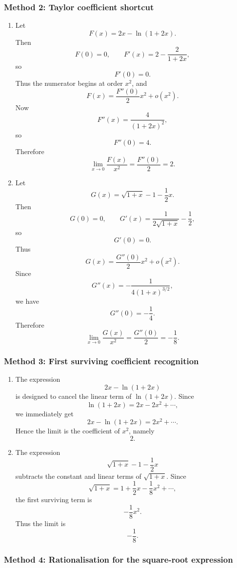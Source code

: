 \documentclass[12pt]{article}
\begin{document}
\subsubsection{Method 2: Taylor coefficient shortcut}

\begin{enumerate}[label=(\alph*)]

\item
Let
\[
F(x)=2x-\ln(1+2x).
\]
Then
\[
F(0)=0,\qquad F'(x)=2-\frac{2}{1+2x},
\]
so
\[
F'(0)=0.
\]
Thus the numerator begins at order \(x^2\), and
\[
F(x)=\frac{F''(0)}{2}x^2+o(x^2).
\]
Now
\[
F''(x)=\frac{4}{(1+2x)^2},
\]
so
\[
F''(0)=4.
\]
Therefore
\[
\boxed{
\lim_{x\to0}\frac{F(x)}{x^2}
=
\frac{F''(0)}{2}
=
2.
}
\]

\item
Let
\[
G(x)=\sqrt{1+x}-1-\frac12x.
\]
Then
\[
G(0)=0,\qquad
G'(x)=\frac{1}{2\sqrt{1+x}}-\frac12,
\]
so
\[
G'(0)=0.
\]
Thus
\[
G(x)=\frac{G''(0)}{2}x^2+o(x^2).
\]
Since
\[
G''(x)=-\frac{1}{4(1+x)^{3/2}},
\]
we have
\[
G''(0)=-\frac14.
\]
Therefore
\[
\boxed{
\lim_{x\to0}\frac{G(x)}{x^2}
=
\frac{G''(0)}{2}
=
-\frac18.
}
\]

\end{enumerate}

\newpage
\subsubsection{Method 3: First surviving coefficient recognition}

\begin{enumerate}[label=(\alph*)]

\item
The expression
\[
2x-\ln(1+2x)
\]
is designed to cancel the linear term of \(\ln(1+2x)\). Since
\[
\ln(1+2x)=2x-2x^2+\cdots,
\]
we immediately get
\[
2x-\ln(1+2x)=2x^2+\cdots.
\]
Hence the limit is the coefficient of \(x^2\), namely
\[
\boxed{2.}
\]

\item
The expression
\[
\sqrt{1+x}-1-\frac12x
\]
subtracts the constant and linear terms of \(\sqrt{1+x}\). Since
\[
\sqrt{1+x}=1+\frac12x-\frac18x^2+\cdots,
\]
the first surviving term is
\[
-\frac18x^2.
\]
Thus the limit is
\[
\boxed{-\frac18.}
\]

\end{enumerate}

\newpage
\subsubsection{Method 4: Rationalisation for the square-root expression}
\end{document}
